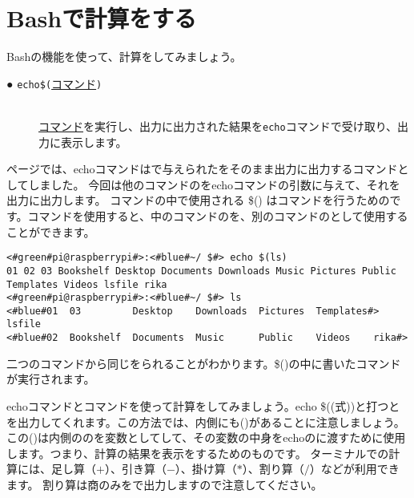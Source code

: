 \newpage
\section{Bashで計算をする}

Bashの機能を使って、計算をしてみましょう。
\begin{description}
    \item[● \texttt{echo}\textvisiblespace\texttt{\$(}\underline{コマンド}\texttt{)}]\mbox{}\\
    \underline{コマンド}を実行し、出力に出力された結果を\texttt{echo}コマンドで受け取り、出力に表示します。
\end{description}

\pageref{cmd:echo}ページでは、echoコマンドはで与えられたをそのまま出力に出力するコマンドとしてしました。
今回は他のコマンドのをechoコマンドの引数に与えて、それを出力に出力します。
コマンドの中で使用される \$() はコマンドを行うためのです。コマンドを使用すると、中のコマンドのを、別のコマンドのとして使用することができます。
\begin{lstlisting}[caption=echo コマンド置換を使った例1, label=cmdsbs:echo]
<#green#pi@raspberrypi#>:<#blue#~/ $#> echo $(ls)
01 02 03 Bookshelf Desktop Documents Downloads Music Pictures Public Templates Videos lsfile rika
<#green#pi@raspberrypi#>:<#blue#~/ $#> ls
<#blue#01  03         Desktop    Downloads  Pictures  Templates#> lsfile
<#blue#02  Bookshelf  Documents  Music      Public    Videos    rika#> 
\end{lstlisting}
二つのコマンドから同じをられることがわかります。\$()の中に書いたコマンドが実行されます。

echoコマンドとコマンドを使って計算をしてみましょう。echo \$((式))と打つとを出力してくれます。この方法では、内側にも()があることに注意しましょう。この()は内側ののを変数としてして、その変数の中身をechoのに渡すために使用します。つまり、計算の結果を表示をするためのものです。
ターミナルでの計算には、足し算（$+$）、引き算（$-$）、掛け算（$*$）、割り算（$/$）などが利用できます。 割り算は商のみをで出力しますので注意してください。

